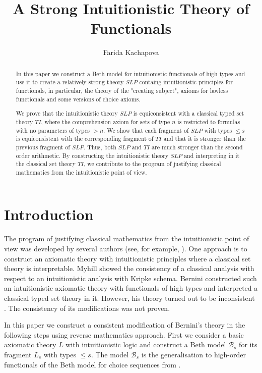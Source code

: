 \documentclass{asl}
\title{A Strong Intuitionistic Theory of Functionals}
\date{}
\author{Farida Kachapova}
\theoremstyle{definition}
\begin{document}
\begin{abstract}
In this paper we construct a Beth model for intuitionistic functionals of high types and use it to create a relatively strong theory $SLP$ containg intuitionistic principles for functionals, in particular, the theory of the "creating subject", axioms for lawless functionals and some versions of choice axioms.

We prove that the intuitionistic theory $SLP$ is equiconsistent with a classical typed set theory $TI$, where the comprehension axiom for sets of type $n$ is restricted to formulas with no parameters of types $>n$. We show that each fragment of $SLP$ with types $\leqslant s$ is equiconsistent with the corresponding fragment of $TI$ and that it is stronger than the previous fragment of $SLP$. Thus, both $SLP$ and $TI$ are much stronger than the second order arithmetic. By constructing the intuitionistic theory $SLP$ and interpreting in it the classical set theory $TI$, we contribute to the program of justifying classical mathematics from the intuitionistic point of view.

\end{abstract}

\maketitle

\section{Introduction}

The program of justifying classical mathematics from the intuitionistic point of view was developed by several authors (see, for example, \cite{myhi68, frie77, bern76, lyub97}). One approach is to construct an axiomatic theory with intuitionistic principles where a classical set theory is interpretable. Myhill \cite{myhi68} showed the consistency of a classical analysis with respect to an intuitionistic analysis with Kripke schema. Bernini \cite{bern76} constructed such an intuitionistic axiomatic theory with functionals of high types and interpreted a classical typed set theory in it. However, his theory turned out to be inconsistent \cite{wend78}. The consistency of its modifications \cite{bern78, wend78} was not proven.

In this paper we construct a consistent modification of Bernini's theory \cite{bern76} in the following steps using reverse mathematics approach. First we consider a basic axiomatic theory $L$ with intuitionistic logic and construct a Beth model $\mathcal{B}_s$ for its fragment $L_s$ with types $\leqslant s$. The model $\mathcal{B}_s$ is the generalisation to high-order functionals of the Beth model for choice sequences from \cite{vand78}.
\end{document}
